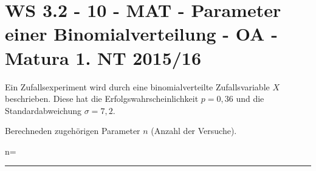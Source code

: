 \section{WS 3.2 - 10 - MAT - Parameter einer Binomialverteilung - OA - Matura 1. NT 2015/16}

\begin{beispiel}[WS 3.2]{1} %
Ein Zufallsexperiment wird durch eine binomialverteilte Zufallsvariable $X$ beschrieben. Diese hat
die Erfolgswahrscheinlichkeit $p = 0,36$ und die Standardabweichung $\sigma = 7,2$.\leer

Berechneden zugehörigen Parameter $n$ (Anzahl der Versuche).\leer

n=\rule{8cm}{0.3pt}


\end{beispiel}